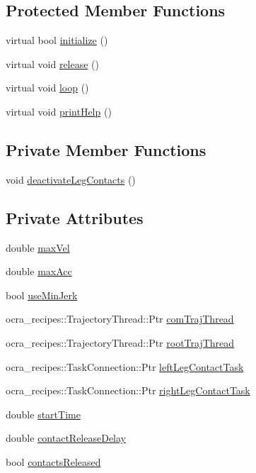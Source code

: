 \subsection*{Protected Member Functions}
\begin{DoxyCompactItemize}
\item 
virtual bool \hyperlink{classStandingDemoClient_a0219c4ae161543b6ea797f27f345593c}{initialize} ()
\item 
virtual void \hyperlink{classStandingDemoClient_abdc4f3642b1ab31ba16375e55a7a68f4}{release} ()
\item 
virtual void \hyperlink{classStandingDemoClient_a294411fb3f128a6a8f5011ea6330af6e}{loop} ()
\item 
virtual void \hyperlink{classStandingDemoClient_ae1f321428f6b67b2f8bf7e1e7a1cd3d4}{print\+Help} ()
\end{DoxyCompactItemize}
\subsection*{Private Member Functions}
\begin{DoxyCompactItemize}
\item 
void \hyperlink{classStandingDemoClient_a6a16f7c8b66d49c6fc63f75ce8eaaf0b}{deactivate\+Leg\+Contacts} ()
\end{DoxyCompactItemize}
\subsection*{Private Attributes}
\begin{DoxyCompactItemize}
\item 
double \hyperlink{classStandingDemoClient_a638e427aef4c4dc6fa38081ab5f9f405}{max\+Vel}
\item 
double \hyperlink{classStandingDemoClient_abc06fc0343cbca7a3faac4dbb1eaa842}{max\+Acc}
\item 
bool \hyperlink{classStandingDemoClient_a47132d5336d2e3b02085d2f153db6385}{use\+Min\+Jerk}
\item 
ocra\+\_\+recipes\+::\+Trajectory\+Thread\+::\+Ptr \hyperlink{classStandingDemoClient_a223aa634ceba696716779461ec1d3f63}{com\+Traj\+Thread}
\item 
ocra\+\_\+recipes\+::\+Trajectory\+Thread\+::\+Ptr \hyperlink{classStandingDemoClient_a4f84e52d8be94fb7fae7a6c0ad8e8adb}{root\+Traj\+Thread}
\item 
ocra\+\_\+recipes\+::\+Task\+Connection\+::\+Ptr \hyperlink{classStandingDemoClient_ad5dfa4632f03e75095c810b6ff2301b4}{left\+Leg\+Contact\+Task}
\item 
ocra\+\_\+recipes\+::\+Task\+Connection\+::\+Ptr \hyperlink{classStandingDemoClient_ad53b834a0927d48917f5b6e830feb0f8}{right\+Leg\+Contact\+Task}
\item 
double \hyperlink{classStandingDemoClient_af05ac205216c20f9780f7e48a9ee4648}{start\+Time}
\item 
double \hyperlink{classStandingDemoClient_a4a13f8bdbc84e3645c7a1ab69012c652}{contact\+Release\+Delay}
\item 
bool \hyperlink{classStandingDemoClient_ac6744005797ac8071776a68b35a7da6d}{contacts\+Released}
\end{DoxyCompactItemize}


